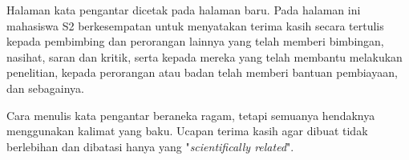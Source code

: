 \documentclass{itb-thesis}
\begin{document}
\preface
\begin{onehalfspace}
Halaman kata pengantar dicetak pada halaman baru. Pada halaman ini mahasiswa S2 berkesempatan untuk menyatakan terima kasih secara tertulis kepada pembimbing dan perorangan lainnya yang telah memberi bimbingan, nasihat, saran dan kritik, serta kepada mereka yang telah membantu melakukan penelitian, kepada perorangan atau badan telah memberi bantuan pembiayaan, dan sebagainya.

\vspace{14pt}

Cara menulis kata pengantar beraneka ragam, tetapi semuanya hendaknya menggunakan kalimat yang baku. Ucapan terima kasih agar dibuat tidak berlebihan dan dibatasi hanya yang "\textit{scientifically related}".
\end{onehalfspace}

\tableofcontents
{}

\listoffigures
{}

\listoftables
{}
\end{document}

